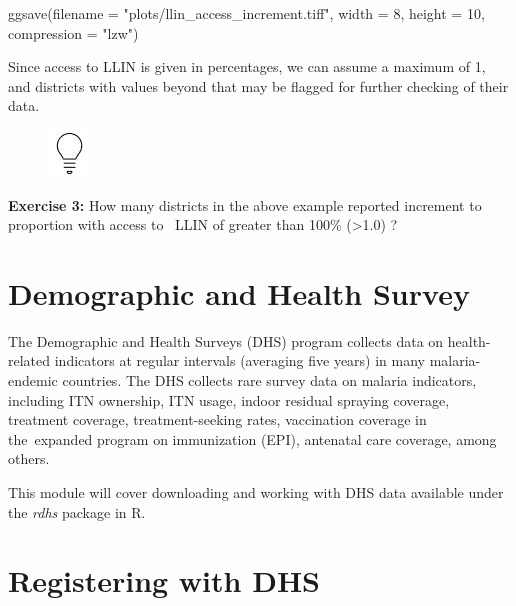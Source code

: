 \documentclass[
  letterpaper,
  DIV=11,
  numbers=noendperiod]{scrreprt}
\newenvironment{Shaded}{\begin{snugshade}}{\end{snugshade}}
\newcommand{\AttributeTok}[1]{\textcolor[rgb]{0.40,0.45,0.13}{#1}}
\newcommand{\DecValTok}[1]{\textcolor[rgb]{0.68,0.00,0.00}{#1}}
\newcommand{\FunctionTok}[1]{\textcolor[rgb]{0.28,0.35,0.67}{#1}}
\newcommand{\NormalTok}[1]{\textcolor[rgb]{0.00,0.23,0.31}{#1}}
\newcommand{\StringTok}[1]{\textcolor[rgb]{0.13,0.47,0.30}{#1}}
\begin{document}
\begin{Shaded}
\begin{Highlighting}[]
\FunctionTok{ggsave}\NormalTok{(}\AttributeTok{filename =} \StringTok{"plots/llin\_access\_increment.tiff"}\NormalTok{,}
       \AttributeTok{width =} \DecValTok{8}\NormalTok{, }\AttributeTok{height =} \DecValTok{10}\NormalTok{, }\AttributeTok{compression =} \StringTok{"lzw"}\NormalTok{)  }
\end{Highlighting}
\end{Shaded}

Since access to LLIN is given in percentages, we can assume a maximum of
1, and districts with values beyond that may be flagged for further
checking of their data. ~

\begin{figure}

\includegraphics{plots/image_01.png} \hfill{}

\end{figure}

\textbf{Exercise 3:} How many districts in the above example reported
increment to proportion with access to~ LLIN of greater than 100\%
(\textgreater1.0) ?


\hypertarget{demographic-and-health-survey}{%
\chapter{Demographic and Health
Survey}\label{demographic-and-health-survey}}

The Demographic and Health Surveys (DHS) program collects data on
health-related indicators at regular intervals (averaging five years) in
many malaria-endemic countries. The DHS collects rare survey data on
malaria indicators, including ITN ownership, ITN usage, indoor residual
spraying coverage, treatment coverage, treatment-seeking rates,
vaccination coverage in the~expanded program on immunization (EPI),
antenatal care coverage, among others.

This module will cover downloading and working with DHS data available
under the \emph{rdhs} package in R.


\hypertarget{registering-with-dhs}{%
\chapter{\texorpdfstring{\textbf{Registering with
DHS}}{Registering with DHS}}\label{registering-with-dhs}}
\end{document}
